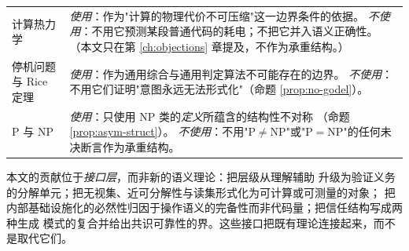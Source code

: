 \begin{longtable}{L{3.6cm}L{10.8cm}}
计算热力学 &
  \emph{使用}：作为"计算的物理代价不可压缩"这一边界条件的依据。
  \emph{不使用}：不用它预测某段普通代码的耗电；不把它并入语义正确性。
  （本文只在第 \ref{ch:objections} 章提及，不作为承重结构。） \\
停机问题与 Rice 定理 &
  \emph{使用}：作为通用综合与通用判定算法不可能存在的边界。
  \emph{不使用}：不用它们证明"意图永远无法形式化"（命题 \ref{prop:no-godel}）。 \\
$\mathrm{P}$ 与 $\mathrm{NP}$ &
  \emph{使用}：只使用 $\mathrm{NP}$ 类的\emph{定义}所蕴含的结构性不对称
  （命题 \ref{prop:asym-struct}）。
  \emph{不使用}：不用"$\mathrm{P} \neq \mathrm{NP}$"或"$\mathrm{P} =
  \mathrm{NP}$"的任何未决断言作为承重结构。 \\
\bottomrule
\end{longtable}

\begin{principle}[本文的定位]\label{pr:self-position}
本文的贡献位于\emph{接口层}，而非新的语义理论：把层级从理解辅助
升级为验证义务的分解单元；把无视集、近可分解性与读集形式化为可计算或可测量的对象；
把内部基础设施化的必然性归因于操作语义的完备性而非代码量；把信任结构写成两种生成
模式的复合并给出共识可靠性的界。这些接口把既有理论连接起来，而不是取代它们。
\end{principle}
